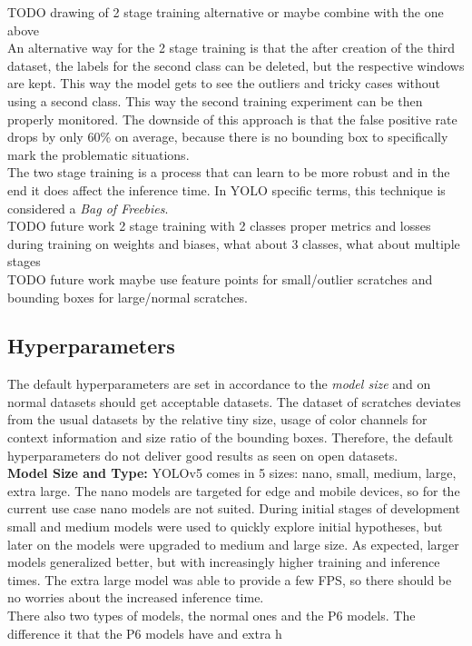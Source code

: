 TODO drawing of 2 stage training alternative or maybe combine with the one above\\
An alternative way for the 2 stage training is that the after creation of the third dataset, the labels for the second class can be deleted, but the respective windows are kept. This way the model gets to see the outliers and tricky cases without using a second class. This way the second training experiment can be then properly monitored. The downside of this approach is that the false positive rate drops by only 60\% on average, because there is no bounding box to specifically mark the problematic situations. \\
The two stage training is a process that can learn to be more robust and in the end it does affect the inference time. In YOLO specific terms, this technique is considered a \textit{Bag of Freebies}. \\

TODO future work 2 stage training with 2 classes proper metrics and losses during training on weights and biases, what about 3 classes, what about multiple stages \\
TODO future work maybe use feature points for small/outlier scratches and bounding boxes for large/normal scratches.


\subsection{Hyperparameters}
The default hyperparameters are set in accordance to the \textit{model size} and on normal datasets should get acceptable datasets. The dataset of scratches deviates from the usual datasets by the relative tiny size, usage of color channels for context information and size ratio of the bounding boxes. Therefore, the default hyperparameters do not deliver good results as seen on open datasets. \\

\textbf{Model Size and Type:}
YOLOv5 comes in 5 sizes: nano, small, medium, large, extra large. The nano models are targeted for edge and mobile devices, so for the current use case nano models are not suited.
During initial stages of development small and medium models were used to quickly explore initial hypotheses, but later on the models were upgraded to medium and large size. As expected, larger models generalized better, but with increasingly higher training and inference times. The extra large model was able to provide a few FPS, so there should be no worries about the increased inference time. \\
There also two types of models, the normal ones and the P6 models. The difference it that the P6 models have and extra h

